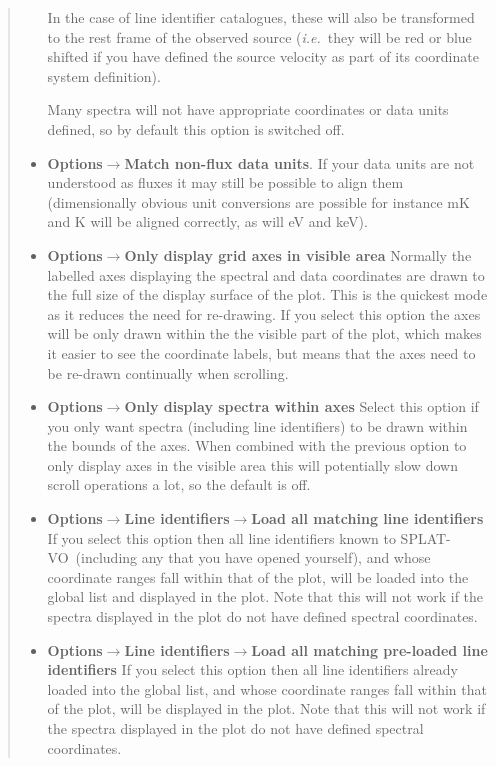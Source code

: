 \documentclass[twoside,11pt]{article}
\newcommand{\latexhtml}[2]{#1}
\renewcommand{\_}{\texttt{\symbol{95}}}
\newcommand{\SPLAT}{\textsf{SPLAT-VO}}
\newcommand{\submenuitem}[2]{\latexhtml{\textbf{#1$\rightarrow$#2}}{\textbf{#1->#2}}}
\newcommand{\subsubmenuitem}[3]{\latexhtml{\textbf{#1$\rightarrow$#2$\rightarrow$#3}}{\textbf{#1->#2->#3}}}
\newcommand{\ie}{\textit{i.e.}}
\begin{document}
\begin{quote}
\begin{itemize}
  In the case of line identifier catalogues, these will also be transformed to
  the rest frame of the observed source (\ie\ they will be red or blue shifted
  if you have defined the source velocity as part of its coordinate system
  definition).

  Many spectra will not have appropriate coordinates or data units defined, so
  by default this option is switched off.

  \item \submenuitem{Options}{Match non-flux data units}.
  If your data units are not understood as fluxes it may still be possible to
  align them (dimensionally obvious unit conversions are possible for instance
  mK and K will be aligned correctly, as will eV and keV).

  \item \submenuitem{Options}{Only display grid axes in visible area}
  Normally the labelled axes displaying the spectral and data coordinates are
  drawn to the full size of the display surface of the plot. This is the
  quickest mode as it reduces the need for re-drawing. If you select this
  option the axes will be only drawn within the the visible part of the plot,
  which makes it easier to see the coordinate labels, but means that the axes
  need to be re-drawn continually when scrolling.

  \item \submenuitem{Options}{Only display spectra within axes}
  Select this option if you only want spectra (including line identifiers) to
  be drawn within the bounds of the axes. When combined with the previous
  option to only display axes in the visible area this will potentially slow
  down scroll operations a lot, so the default is off.

  \item \subsubmenuitem{Options}{Line identifiers}{Load all matching line identifiers}
  If you select this option then all line identifiers known to \SPLAT\
  (including any that you have opened yourself), and whose coordinate ranges
  fall within that of the plot, will be loaded into the global list and
  displayed in the plot. Note that this will not work if the spectra displayed
  in the plot do not have defined spectral coordinates.

  \item \subsubmenuitem{Options}{Line identifiers}{Load all matching pre-loaded line identifiers}
  If you select this option then all line identifiers already loaded into the
  global list, and whose coordinate ranges fall within that of the plot, will
  be displayed in the plot. Note that this will not work if the spectra
  displayed in the plot do not have defined spectral coordinates.


\end{itemize}
\end{quote}
\end{document}
